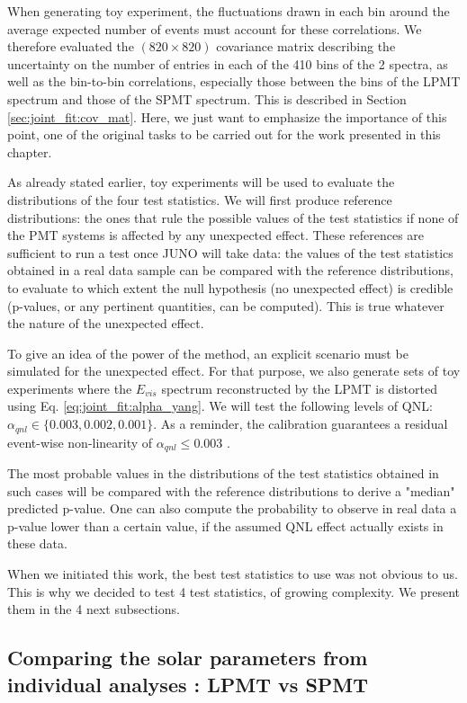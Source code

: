 \documentclass[../main.tex]{subfiles}
\begin{document}
When generating toy experiment, the fluctuations drawn in each bin around the average expected number of events must account for these correlations. We therefore evaluated the $(820 \times 820)$ covariance matrix describing the uncertainty on the number of entries in each of the 410 bins of the 2 spectra, as well as the bin-to-bin correlations, especially those between the bins of the LPMT spectrum and those of the SPMT spectrum. This is described in Section \ref{sec:joint_fit:cov_mat}. Here, we just want to emphasize the importance of this point, one of the original tasks to be carried out for the work presented in this chapter.

As already stated earlier, toy experiments will be used to evaluate the distributions of the four test statistics. We will first produce reference distributions: the ones that rule the possible values of the test statistics if none of the PMT systems is affected by any unexpected effect. These references are sufficient to run a test once JUNO will take data: the values of the test statistics  obtained in a real data sample can be compared with the reference distributions, to evaluate to which extent the null hypothesis (no unexpected effect) is credible (p-values, or any pertinent quantities, can be computed). This is true whatever the nature of the unexpected effect.

To give an idea of the power of the method, an explicit scenario must be simulated for the unexpected effect. For that purpose, we also generate sets of toy experiments where the $E_{vis}$ spectrum reconstructed by the LPMT is distorted using Eq. \ref{eq:joint_fit:alpha_yang}. We will test the following levels of QNL: $\alpha_{qnl} \in \{0.003, 0.002, 0.001\}$. As a reminder, the calibration guarantees a residual event-wise non-linearity of $\alpha_{qnl} \leq 0.003$ \cite{juno_collaboration_calibration_2021}.

The most probable values in the distributions of the test statistics obtained in such cases will be compared with the reference distributions to derive a "median" predicted p-value. One can also compute the probability to observe in real data a p-value lower than a certain value, if the assumed QNL effect actually exists in these data.

When we initiated this work, the best test statistics to use was not obvious to us. This is why we decided to test 4 test statistics, of growing complexity. We present them in the 4 next subsections.

\subsection{Comparing the solar parameters from individual analyses : LPMT vs SPMT}
\label{sec:joint_fit:approach:comp}
\end{document}
